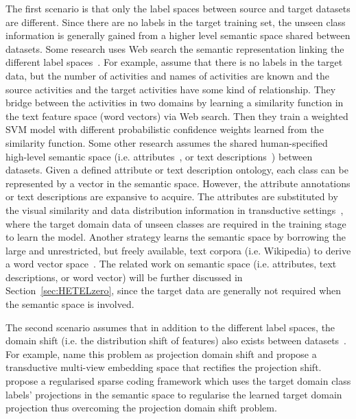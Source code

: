 \documentclass[prodmode]{acmsmall}  %
\begin{document}
The first scenario is that only the label spaces between source and target datasets are different. Since there are no labels in the target training set, the unseen class information is generally gained from a higher level semantic space shared between datasets. Some research uses Web search the semantic representation linking the different label spaces~\cite{Zheng2009,Hu2011}. For example,  assume that there is no labels in the target data, but the number of activities and names of activities are known and the source activities and the target activities have some kind of relationship. They bridge between the activities in two domains by learning a similarity function in the text feature space (word vectors) via Web search. Then they train a weighted SVM model with different probabilistic confidence weights learned from the similarity function. Some other research assumes the shared human-specified high-level semantic space (i.e. attributes~\cite{Palatucci2009}, or text descriptions~\cite{Reed2016}) between datasets. Given a defined attribute or text description ontology, each class can be represented by a vector in the semantic space. However, the attribute annotations or text descriptions are expansive to acquire. The attributes are substituted by the visual similarity and data distribution information in transductive settings~\cite{Li2015,Zhang2015,Zhang2016a,Zhang2016b}, where the target domain data of unseen classes are required in the training stage to learn the model. Another strategy learns the semantic space by borrowing the large and unrestricted, but freely available, text corpora (i.e. Wikipedia) to derive a word vector space~\cite{Frome2013,Mikolov2013,Socher2013}. The related work on semantic space (i.e. attributes, text descriptions, or word vector) will be further discussed in Section~\ref{sec:HETELzero}, since the target data are generally not required when the semantic space is involved. 

The second scenario assumes that in addition to the different label spaces, the domain shift (i.e. the distribution shift of features) also exists between datasets~\cite{Fu2015,Kodirov2015,Wang2016a}. For example,  name this problem as projection domain shift and propose a transductive multi-view embedding space that rectifies the projection shift.  propose a regularised sparse coding framework which uses the target domain class labels' projections in the semantic space to regularise the learned target domain projection thus overcoming the projection domain shift problem. 
\end{document}
